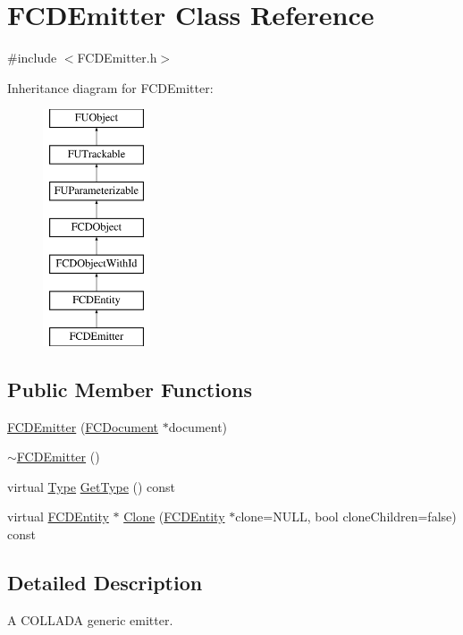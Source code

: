 \hypertarget{classFCDEmitter}{
\section{FCDEmitter Class Reference}
\label{classFCDEmitter}
}


{\ttfamily \#include $<$FCDEmitter.h$>$}

Inheritance diagram for FCDEmitter:\begin{figure}[H]
\begin{center}
\leavevmode
\includegraphics[height=7.000000cm]{classFCDEmitter}
\end{center}
\end{figure}
\subsection*{Public Member Functions}
\begin{DoxyCompactItemize}
\item 
\hyperlink{classFCDEmitter_a49f90e56fcc799ae7c87bca9ba5d2a8e}{FCDEmitter} (\hyperlink{classFCDocument}{FCDocument} $\ast$document)
\item 
\hyperlink{classFCDEmitter_a5903b5d66d3877e062549c433ea98d1d}{$\sim$FCDEmitter} ()
\item 
virtual \hyperlink{classFCDEntity_a9301a4bd5f4d4190ec13e40db4effdd7}{Type} \hyperlink{classFCDEmitter_a2921acf052b38f68d148b0fdcaa366b9}{GetType} () const 
\item 
virtual \hyperlink{classFCDEntity}{FCDEntity} $\ast$ \hyperlink{classFCDEmitter_afdd49a87fe2fdb95b425f62bac8150d6}{Clone} (\hyperlink{classFCDEntity}{FCDEntity} $\ast$clone=NULL, bool cloneChildren=false) const 
\end{DoxyCompactItemize}


\subsection{Detailed Description}
A COLLADA generic emitter.

